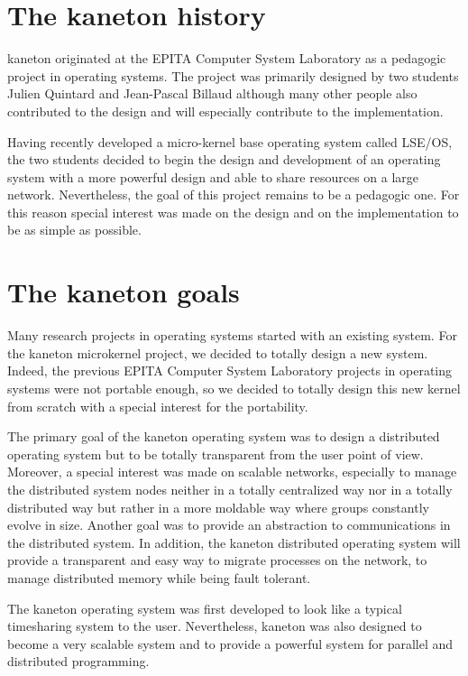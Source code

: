 \documentclass[10pt,a4wide]{article}
\begin{document}
\begin{multicols}{2}



\section{The kaneton history}

kaneton originated at the EPITA Computer System Laboratory as a pedagogic
project in operating systems. The project was primarily designed by two students
Julien Quintard and Jean-Pascal Billaud although many other people also
contributed to the design and will especially contribute to the implementation.

Having recently developed a micro-kernel base operating system called LSE/OS,
the two students decided to begin the design and development of an operating
system with a more powerful design and able to share resources on a large
network. Nevertheless, the goal of this project remains to be a pedagogic
one. For this reason special interest was made on the design and on the
implementation to be as simple as possible.




\section{The kaneton goals}

Many research projects in operating systems started with an existing system.
For the kaneton microkernel project, we decided to totally design a
new system. Indeed, the previous EPITA Computer System Laboratory projects in
operating systems were not portable enough, so we decided to totally design
this new kernel from scratch with a special interest for the portability.

The primary goal of the kaneton operating system was to design a distributed
operating system but to be totally transparent from the user point of view.
Moreover, a special interest was made on scalable networks, especially
to manage the distributed system nodes neither in a totally centralized way
nor in a totally distributed way but rather in a more moldable way where groups
constantly evolve in size. Another goal was to provide an abstraction to
communications in the distributed system. In addition, the kaneton distributed
operating system will provide a transparent and easy way to migrate processes
on the network, to manage distributed memory while being fault tolerant.

The kaneton operating system was first developed to look like a typical
timesharing system to the user. Nevertheless, kaneton was also designed to
become a very scalable system and to provide a powerful system for
parallel and distributed programming.




\end{multicols}
\end{document}
